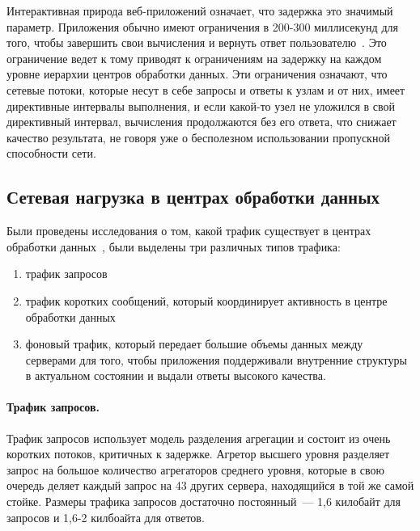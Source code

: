 \documentclass[14pt, a4paper,oneside]{extarticle}
\begin{document}
Интерактивная природа веб-приложений означает, что задержка это значимый параметр. Приложения обычно имеют ограничения в 200-300 миллисекунд для того, чтобы завершить свои вычисления и вернуть ответ пользователю~\cite{sla}. Это ограничение ведет к тому приводят к ограничениям на задержку на каждом уровне иерархии центров обработки данных. Эти ограничения означают, что сетевые потоки, которые несут в себе запросы и ответы к узлам и от них, имеет директивные интервалы выполнения, и если какой-то узел не уложился в свой директивный интервал, вычисления продолжаются без его ответа, что снижает качество результата, не говоря уже о бесполезном использовании пропускной способности сети.

\subsection{Сетевая нагрузка в центрах обработки данных}
Были проведены исследования о том, какой трафик существует в центрах обработки данных~\cite{dctcp}, были выделены три различных типов трафика:
\begin{enumerate}
\item трафик запросов
\item трафик коротких сообщений, который координирует активность в центре обработки данных
\item фоновый трафик, который передает большие объемы данных между серверами для того, чтобы приложения поддерживали внутренние структуры в актуальном состоянии и выдали ответы высокого качества.
\end{enumerate}

\paragraph{Трафик запросов.}
Трафик запросов использует модель разделения агрегации и состоит из очень коротких потоков, критичных к задержке. Агретор высшего уровня разделяет запрос на большое количество агрегаторов среднего уровня, которые в свою очередь деляет каждый запрос на 43 других сервера, находящийся в той же самой стойке. Размеры трафика запросов достаточно постоянный~--- 1,6 килобайт для запросов и 1,6-2 килбоайта для ответов.
\end{document}
